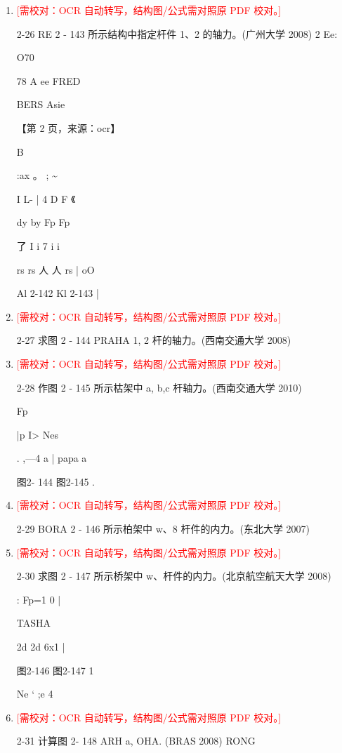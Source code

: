 \documentclass[UTF8,12pt,a4paper,openany]{ctexbook}
\newcommand{\TODO}[1]{\textcolor{red}{[需校对：#1]}}
\begin{document}
\begin{enumerate}[label=\textbf{\arabic*.},leftmargin=2em]
\item \TODO{OCR 自动转写，结构图/公式需对照原 PDF 校对。}\par 2-26 RE 2 - 143 所示结构中指定杆件 1、2 的轴力。(广州大学 2008)      2 Ee:\par O70\par 78           A ee FRED\par BERS Asie\par \par 【第 2 页，来源：ocr】\par B\par :ax 。              ;        \textasciitilde{}\par I L- |    4       D   F     《\par dy           by             Fp        Fp\par 了   I   i            7    i    i\par rs rs        人 人 rs |        oO\par Al 2-142                Kl 2-143         |
\item \TODO{OCR 自动转写，结构图/公式需对照原 PDF 校对。}\par 2-27 求图 2 - 144 PRAHA 1, 2 杆的轴力。(西南交通大学 2008)
\item \TODO{OCR 自动转写，结构图/公式需对照原 PDF 校对。}\par 2-28 作图 2 - 145 所示枯架中 a, b,c 杆轴力。(西南交通大学 2010)\par Fp\par |p        I>          Nes\par . ,—4 a |  papa a\par 图2- 144                  图2-145      .
\item \TODO{OCR 自动转写，结构图/公式需对照原 PDF 校对。}\par 2-29 BORA 2 - 146 所示柏架中 w、8 杆件的内力。(东北大学 2007)
\item \TODO{OCR 自动转写，结构图/公式需对照原 PDF 校对。}\par 2-30 求图 2 - 147 所示桥架中 w、杆件的内力。(北京航空航天大学 2008)\par : Fp=1  0          |\par TASHA\par 2d   2d        6x1         |\par 图2-146                     图2-147                       1\par Ne ‘ ;e 4
\item \TODO{OCR 自动转写，结构图/公式需对照原 PDF 校对。}\par 2-31 计算图 2- 148 ARH a, OHA. (BRAS 2008)           RONG

\end{enumerate}
\end{document}
